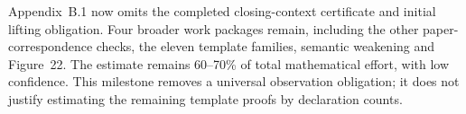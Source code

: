 
Appendix~B.1 now omits the completed closing-context certificate and initial
lifting obligation. Four broader work packages remain, including the other
paper-correspondence checks, the eleven template families, semantic weakening
and Figure~22. The estimate remains 60--70\% of total mathematical effort,
with low confidence. This milestone removes a universal observation obligation;
it does not justify estimating the remaining template proofs by declaration
counts.
